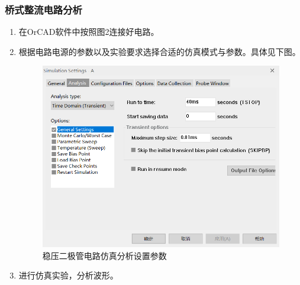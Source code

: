 \documentclass{../source/Experiment}
\begin{document}
                \subsubsection{桥式整流电路分析}
                    \begin{enumerate}
                        \item 在OrCAD软件中按照图2连接好电路。
                        \item 根据电路电源的参数以及实验要求选择合适的仿真模式与参数。具体见下图。
                        \newpage
                        \begin{figure}[h]
                            \centering
                            \includegraphics[scale = 0.6]{pic/桥式与稳压二极管/d2.png}
                            \caption{稳压二极管电路仿真分析设置参数}
                        \end{figure}
                        \item 进行仿真实验，分析波形。
                    \end{enumerate}
\end{document}
